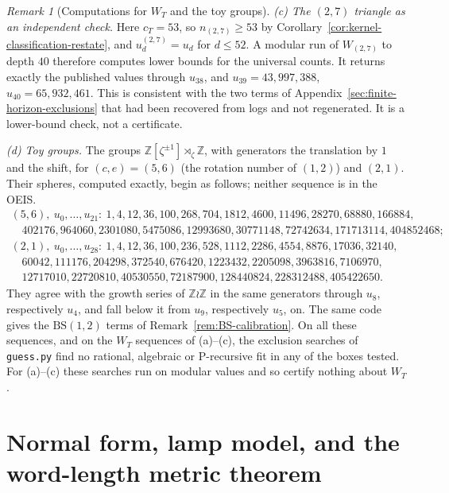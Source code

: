 \documentclass[11pt]{article}
\theoremstyle{plain}
\theoremstyle{definition}
\theoremstyle{remark}
\newtheorem{remark}[theorem]{Remark}
\newcommand{\Z}{\mathbb{Z}}
\begin{document}
\begin{remark}[Computations for $W_T$ and the toy groups]
\emph{(c) The $(2,7)$ triangle as an independent check.} Here $c_T=53$, so
$n_{(2,7)}\ge53$ by Corollary~\ref{cor:kernel-classification-restate}, and
$u_d^{(2,7)}=u_d$ for $d\le52$. A modular run of $W_{(2,7)}$ to depth $40$
therefore computes lower bounds for the universal counts. It returns exactly
the published values through $u_{38}$, and $u_{39}=43{,}997{,}388$,
$u_{40}=65{,}932{,}461$. This is consistent with the two terms of
Appendix~\ref{sec:finite-horizon-exclusions} that had been recovered from
logs and not regenerated. It is a lower-bound check, not a certificate.

\emph{(d) Toy groups.} The groups $\Z[\zeta^{\pm1}]\rtimes_\zeta\Z$, with
generators the translation by $1$ and the shift, for $(c,e)=(5,6)$ (the
rotation number of $(1,2)$) and $(2,1)$. Their spheres, computed exactly, begin
as follows; neither sequence is in the OEIS.
\[
\begin{array}{l}
(5,6),\ u_0,\dots,u_{21}\colon\ 1, 4, 12, 36, 100, 268, 704, 1812, 4600, 11496, 28270, 68880, 166884,\\
\quad 402176, 964060, 2301080, 5475086, 12993680, 30771148, 72742634, 171713114, 404852468;\\[2pt]
(2,1),\ u_0,\dots,u_{28}\colon\ 1, 4, 12, 36, 100, 236, 528, 1112, 2286, 4554, 8876, 17036, 32140,\\
\quad 60042, 111176, 204298, 372540, 676420, 1223432, 2205098, 3963816, 7106970,\\
\quad 12717010, 22720810, 40530550, 72187900, 128440824, 228312488, 405422650.
\end{array}
\]
They agree with the growth series of $\Z\wr\Z$ in the same generators through
$u_8$, respectively $u_4$, and fall below it from $u_9$, respectively $u_5$,
on. The same code gives the $\mathrm{BS}(1,2)$ terms of
Remark~\ref{rem:BS-calibration}. On all these sequences, and on the
$W_T$ sequences of (a)--(c), the exclusion searches of
\texttt{guess.py} find no rational, algebraic or P-recursive fit in any of the
boxes tested. For (a)--(c) these searches run on modular values and so
certify nothing about $W_T$.
\end{remark}


\section{Normal form, lamp model, and the word-length metric theorem}
\label{sec:metric}
\end{document}
